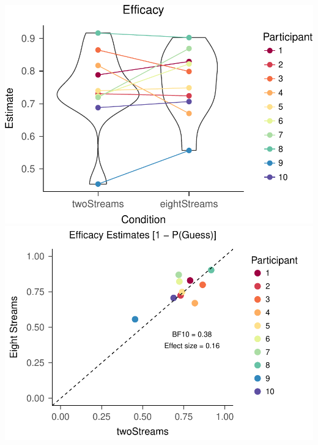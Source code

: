 \documentclass[,man]{apa6}
\begin{document}
\includegraphics{nStreams_Bayesian_files/figure-latex/unnamed-chunk-5-1.pdf}
\includegraphics{nStreams_Bayesian_files/figure-latex/unnamed-chunk-5-2.pdf}
\end{document}
